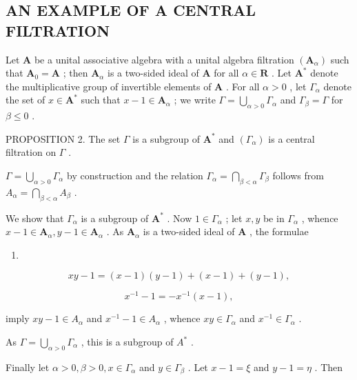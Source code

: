 \subsection{AN EXAMPLE OF A CENTRAL FILTRATION}

Let \(\mathbf{A}\) be a unital associative algebra with a unital algebra filtration \((\mathbf{A}_{\alpha})\) such that \(\mathbf{A}_{0} = \mathbf{A}\) ; then \(\mathbf{A}_{\alpha}\) is a two-sided ideal of \(\mathbf{A}\) for all \(\alpha \in \mathbf{R}\) . Let \(\mathbf{A}^*\) denote the multiplicative group of invertible elements of \(\mathbf{A}\) . For all \(\alpha > 0\) , let \(\Gamma_{\alpha}\) denote the set of \(x \in \mathbf{A}^*\) such that \(x - 1 \in \mathbf{A}_{\alpha}\) ; we write \(\Gamma = \bigcup_{\alpha > 0} \Gamma_{\alpha}\) and \(\Gamma_{\beta} = \Gamma\) for \(\beta \leqslant 0\) .

PROPOSITION 2. The set \(\Gamma\) is a subgroup of \(\mathbf{A}^*\) and \((\Gamma_{\alpha})\) is a central filtration on \(\Gamma\) .

\(\Gamma = \bigcup_{\alpha > 0} \Gamma_{\alpha}\) by construction and the relation \(\Gamma_{\alpha} = \bigcap_{\beta < \alpha} \Gamma_{\beta}\) follows from \(A_{\alpha} = \bigcap_{\beta < \alpha} A_{\beta}\) .

We show that \(\Gamma_{\alpha}\) is a subgroup of \(\mathbf{A}^*\) . Now \(1 \in \Gamma_{\alpha}\) ; let \(x, y\) be in \(\Gamma_{\alpha}\) , whence \(x - 1 \in \mathbf{A}_{\alpha}, y - 1 \in \mathbf{A}_{\alpha}\) . As \(\mathbf{A}_{\alpha}\) is a two-sided ideal of \(\mathbf{A}\) , the formulae

\begin{enumerate}
\def\labelenumi{(\arabic{enumi})}
\setcounter{enumi}{20}
\tightlist
\item
\end{enumerate}

\[
x y - 1 = (x - 1) (y - 1) + (x - 1) + (y - 1),\tag{21}
\]

\[
x ^ {- 1} - 1 = - x ^ {- 1} (x - 1),\tag{22}
\]

imply \(xy - 1 \in A_{\alpha}\) and \(x^{-1} - 1 \in A_{\alpha}\) , whence \(xy \in \Gamma_{\alpha}\) and \(x^{-1} \in \Gamma_{\alpha}\) .

As \(\Gamma = \bigcup_{\alpha > 0} \Gamma_{\alpha}\) , this is a subgroup of \(A^{*}\) .

Finally let \(\alpha > 0, \beta > 0, x \in \Gamma_{\alpha}\) and \(y \in \Gamma_{\beta}\) . Let \(x - 1 = \xi\) and \(y - 1 = \eta\) . Then

